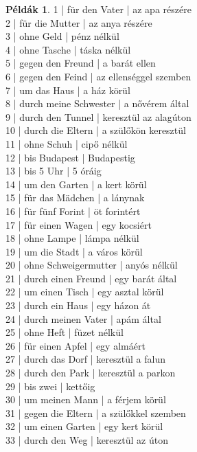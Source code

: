 \documentclass{article}
\theoremstyle{definition}
\newtheorem*{exmp}{Példák}
\begin{document}
\begin{exmp}
1 | für den Vater | az apa részére\\
2 | für die Mutter | az anya részére\\
3 | ohne Geld | pénz nélkül\\
4 | ohne Tasche | táska nélkül\\
5 | gegen den Freund | a barát ellen\\
6 | gegen den Feind | az ellenséggel szemben\\
7 | um das Haus | a ház körül\\
8 | durch meine Schwester | a nővérem által\\
9 | durch den Tunnel | keresztül az alagúton\\
10 | durch die Eltern | a szülőkön keresztül\\
11 | ohne Schuh | cipő nélkül\\
12 | bis Budapest | Budapestig\\
13 | bis 5 Uhr | 5 óráig\\
14 | um den Garten | a kert körül\\
15 | für das Mädchen | a lánynak\\
16 | für fünf Forint | öt forintért\\
17 | für einen Wagen | egy kocsiért\\
18 | ohne Lampe | lámpa nélkül\\
19 | um die Stadt | a város körül\\
20 | ohne Schweigermutter | anyós nélkül\\
21 | durch einen Freund | egy barát által\\
22 | um einen Tisch | egy asztal körül\\
23 | durch ein Haus | egy házon át\\
24 | durch meinen Vater | apám által\\
25 | ohne Heft | füzet nélkül\\
26 | für einen Apfel | egy almáért\\
27 | durch das Dorf | keresztül a falun\\
28 | durch den Park | keresztül a parkon\\
29 | bis zwei | kettőig\\
30 | um meinen Mann | a férjem körül\\
31 | gegen die Eltern | a szülőkkel szemben\\
32 | um einen Garten | egy kert körül\\
33 | durch den Weg | keresztül az úton\\

\end{exmp}
\end{document}

